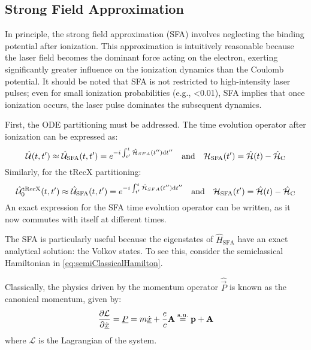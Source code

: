 \subsection{Strong Field Approximation}
In principle, the strong field approximation (SFA) involves neglecting the binding potential after ionization.
This approximation is intuitively reasonable because the laser field becomes the dominant force acting on the electron, exerting significantly greater influence on the ionization dynamics than the Coulomb potential.
It should be noted that SFA is not restricted to high-intensity laser pulses; even for small ionization probabilities (e.g., <0.01), SFA implies that once ionization occurs, the laser pulse dominates the subsequent dynamics.

First, the ODE partitioning must be addressed.
The time evolution operator after ionization can be expressed as:
\begin{equation*}
    \hat{\mathcal{U}}(t,t') \approx \hat{\mathcal{U}}_{\mathrm{SFA}}(t,t')=e^{-i \int_{t'}^{t} \hat{\mathcal{H}}_{SFA}(t'') \mathrm{d} t''} \quad \text{and} \quad \mathcal{H}_{\mathrm{SFA}}(t') = \hat{\mathcal{H}}(t) - \hat{\mathcal{H}}_{\mathrm{C}}      \label{eq:sfa_formula}
\end{equation*}
Similarly, for the tRecX partitioning:
\begin{equation*}
    \hat{\mathcal{U}}^{\mathrm{tRecX}}_0(t,t') \approx \hat{\mathcal{U}}_{\mathrm{SFA}}(t,t')=e^{-i \int_{t'}^{t} \hat{\mathcal{H}}_{SFA}(t'') \mathrm{d} t''} \quad \text{and} \quad \mathcal{H}_{\mathrm{SFA}}(t') = \hat{\mathcal{H}}(t) - \hat{\mathcal{H}}_{\mathrm{C}}      \label{eq:sfa_formula}
\end{equation*}
An exact expression for the SFA time evolution operator can be written, as it now commutes with itself at different times.

The SFA is particularly useful because the eigenstates of $\hat{H}_{\mathrm{SFA}}$ have an exact analytical solution: the Volkov states. 
To see this, consider the semiclassical Hamiltonian in \eqref{eq:semiClassicalHamilton}.

Classically, the physics driven by the momentum operator $\hat{\vec{P}}$ is known as the canonical momentum, given by:
\begin{equation}
    \frac{\partial \mathcal{L}}{\partial \dot{\underline{x}}} = \underline{P} = m\underline{\dot{x}} + \frac{e}{c}\mathbf{A} \stackrel{\mathrm{a.u.}}{=} \mathbf{p} + \mathbf{A}    \label{eq:canonicalMomentum}
\end{equation}
where $\mathcal{L}$ is the Lagrangian of the system.

